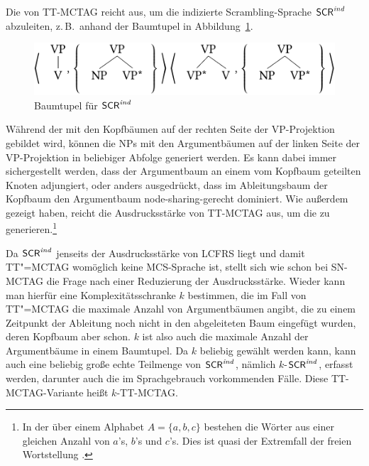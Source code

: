 Die  von TT-MCTAG reicht aus, um die indizierte Scrambling-Sprache $\mathsf{SCR}^{\mathit{ind}}$ abzuleiten, z.\,B.\ anhand der Baumtupel in Abbildung~\ref{fig-ttmctag-scr}.  
\begin{figure}[t]
\centering
\includegraphics{graphics/abb73.pdf}
\caption{Baumtupel für $\mathsf{SCR}^{\mathit{ind}}$\label{fig-ttmctag-scr}}
\end{figure}
Während der  mit den Kopfbäumen auf der rechten Seite der VP-Projektion gebildet wird, können die NPs mit den Argumentbäumen auf der linken Seite der VP-Projektion in beliebiger Abfolge generiert werden. Es kann dabei immer sichergestellt werden, dass der Argumentbaum an einem vom Kopfbaum geteilten Knoten adjungiert, oder anders ausgedrückt, dass im Ableitungsbaum der Kopfbaum den Argumentbaum node-sharing-gerecht dominiert. Wie  \citet{Sogaard:Lichte:Maier:07} au\ss erdem gezeigt haben, reicht die Ausdrucksstärke von TT-MCTAG  aus, um die  zu generieren.\footnote{In der  über einem Alphabet $A=\{a,b,c\}$ bestehen die Wörter aus einer gleichen Anzahl von $a$'s, $b$'s und $c$'s. Dies ist quasi der Extremfall der freien Wortstellung \citep{Bach:88}.}

Da $\mathsf{SCR}^{\mathit{ind}}$ jenseits der Ausdrucksstärke von LCFRS liegt und damit TT"=MCTAG womöglich keine MCS-Sprache ist, stellt sich wie schon bei SN-MCTAG die Frage nach einer Reduzierung der Ausdrucksstärke. Wieder kann man hierfür eine Komplexitätsschranke $k$ bestimmen, die im Fall von TT"=MCTAG die maximale Anzahl von Argumentbäumen angibt, die zu einem Zeitpunkt der Ableitung noch nicht in den abgeleiteten Baum eingefügt wurden, deren Kopfbaum aber schon. $k$ ist also auch die maximale Anzahl der Argumentbäume in einem Baumtupel. Da $k$ beliebig gewählt werden kann, kann auch eine beliebig gro\ss e echte Teilmenge von $\mathsf{SCR}^{\mathit{ind}}$, nämlich $k$-$\mathsf{SCR}^{\mathit{ind}}$, erfasst werden, darunter auch die im Sprachgebrauch vorkommenden Fälle. Diese TT-MCTAG-Variante hei\ss t $k$-TT-MCTAG.

